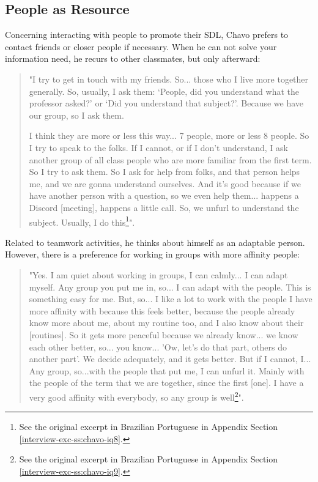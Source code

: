 \subsection{People as Resource}
\label{results-ss:people}

Concerning interacting with people to promote their \gls{SDL}, Chavo prefers to contact friends or closer people if necessary. When he can not solve your information need, he recurs to other classmates, but only afterward: 
\begin{quote}
    "I try to get in touch with my friends. So... those who I live more together generally. So, usually, I ask them: `People, did you understand what the professor asked?' or `Did you understand that subject?'. Because we have our group, so I ask them.

    I think they are more or less this way... 7 people, more or less 8 people. So I try to speak to the folks. If I cannot, or if I don't understand, I ask another group of all class people who are more familiar from the first term. So I try to ask them. So I ask for help from folks, and that person helps me, and we are gonna understand ourselves. And it's good because if we have another person with a question, so we even help them... happens a Discord [meeting], happens a little call. So, we unfurl to understand the subject. Usually, I do this\footnote{See the original excerpt in Brazilian Portuguese in Appendix Section \ref{interview-exc-ss:chavo-iq8}.}".
\end{quote}
Related to teamwork activities, he thinks about himself as an adaptable person. However, there is a preference for working in groups with more affinity people:
\begin{quote}
    "Yes. I am quiet about working in groups, I can calmly... I can adapt myself. Any group you put me in, so... I can adapt with the people. This is something easy for me. But, so... I like a lot to work with the people I have more affinity with because this feels better, because the people already know more about me, about my routine too, and I also know about their [routines]. So it gets more peaceful because we already know... we know each other better, so... you know... 'Ow, let's do that part, others do another part'. We decide adequately, and it gets better. But if I cannot, I... Any group, so...with the people that put me, I can unfurl it. Mainly with the people of the term that we are together, since the first [one]. I have a very good affinity with everybody, so any group is well\footnote{See the original excerpt in Brazilian Portuguese in Appendix Section \ref{interview-exc-ss:chavo-iq9}.}".
\end{quote}

